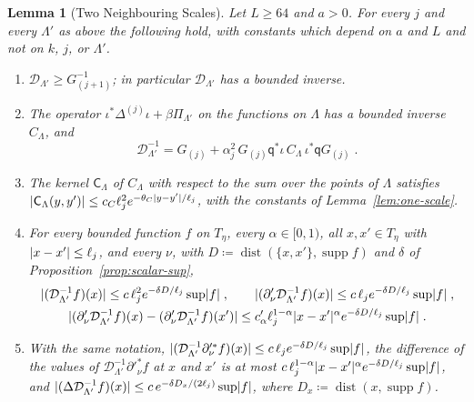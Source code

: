 \documentclass[11pt]{preprint}
\newcommand{\dist}{\operatorname{dist}}
\DeclarePairedDelimiter{\abs}{\lvert}{\rvert}
\numberwithin{equation}{section}
\newtheorem{lemma}[theorem]{Lemma}
\theoremstyle{definition}
\theoremstyle{remark}
\theoremstyle{plain}
\begin{document}
\begin{lemma}[Two Neighbouring Scales]\label{lem:two-scales}
Let $L \geq 64$ and $a > 0$. For every $j$ and every $\Lambda'$ as above the following hold, with constants which depend on $a$ and $L$ and not on $k$, $j$, or $\Lambda'$.
\begin{enumerate}[label=(\roman*)]
\item $\mathcal D_{\Lambda'} \geq G_{(j+1)}^{-1}$; in particular $\mathcal D_{\Lambda'}$ has a bounded inverse.
\item The operator $\iota^*\Delta^{(j)}\iota + \beta\Pi_{\Lambda'}$ on the functions on $\Lambda$ has a bounded inverse $C_\Lambda$, and
\begin{equation}\label{eq:two-scale-inverse}
    \mathcal D_{\Lambda'}^{-1} = G_{(j)} + \alpha_j^2\,G_{(j)}\mathsf q^*\iota\,C_\Lambda\,\iota^*\mathsf qG_{(j)}\;.
\end{equation}
\item The kernel $\mathsf C_\Lambda$ of $C_\Lambda$ with respect to the sum over the points of $\Lambda$ satisfies $\abs{\mathsf C_\Lambda(y, y')} \leq c_C\ell_j^2e^{-\theta_C\abs{y - y'}/\ell_j}$, with the constants of Lemma~\ref{lem:one-scale}.
\item For every bounded function $f$ on $T_\eta$, every $\alpha \in [0, 1)$, all $x, x' \in T_\eta$ with $\abs{x - x'} \leq \ell_j$, and every $\nu$, with $D \coloneqq \dist(\{ x, x' \}, \operatorname{supp}f)$ and $\delta$ of Proposition~\ref{prop:scalar-sup},
\begin{equation}\label{eq:two-scale-bounds}
\begin{gathered}
    \abs{(\mathcal D_{\Lambda'}^{-1}f)(x)} \leq c\,\ell_j^2e^{-\delta D/\ell_j}\sup\abs f\;,
    \qquad
    \abs{(\partial'_\nu\mathcal D_{\Lambda'}^{-1}f)(x)} \leq c\,\ell_je^{-\delta D/\ell_j}\sup\abs f\;,\\
    \abs{(\partial'_\nu\mathcal D_{\Lambda'}^{-1}f)(x) - (\partial'_\nu\mathcal D_{\Lambda'}^{-1}f)(x')} \leq c'_\alpha\ell_j^{1-\alpha}\abs{x - x'}^\alpha e^{-\delta D/\ell_j}\sup\abs f\;.
\end{gathered}
\end{equation}
\item With the same notation, $\abs{(\mathcal D_{\Lambda'}^{-1}\partial'^*_\nu f)(x)} \leq c\,\ell_je^{-\delta D/\ell_j}\sup\abs f$, the difference of the values of $\mathcal D_{\Lambda'}^{-1}\partial'^*_\nu f$ at $x$ and $x'$ is at most $c\,\ell_j^{1-\alpha}\abs{x - x'}^\alpha e^{-\delta D/\ell_j}\sup\abs f$, and $\abs{(\Delta\mathcal D_{\Lambda'}^{-1}f)(x)} \leq c\,e^{-\delta D_x/(2\ell_j)}\sup\abs f$, where $D_x \coloneqq \dist(x, \operatorname{supp}f)$.
\end{enumerate}
\end{lemma}
\end{document}
